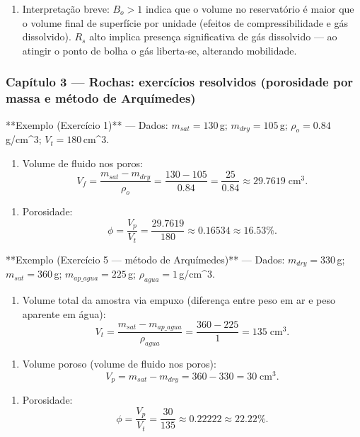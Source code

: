 \documentclass[11pt,a4paper]{article}
\begin{document}
\begin{enumerate}[label=\Alph*)]
\item Interpretação breve: $B_o>1$ indica que o volume no reservatório é maior que o volume final de superfície por unidade (efeitos de compressibilidade e gás dissolvido). $R_s$ alto implica presença significativa de gás dissolvido — ao atingir o ponto de bolha o gás liberta‑se, alterando mobilidade.\n\end{enumerate}

\subsubsection{Capítulo 3 — Rochas: exercícios resolvidos (porosidade por massa e método de Arquímedes)}

**Exemplo (Exercício 1)** — Dados: $m_{sat}=130\,$g; $m_{dry}=105\,$g; $\rho_o=0.84\,$g/cm^3; $V_t=180\,$cm^3.

\begin{enumerate}
\item Volume de fluido nos poros:
$$V_f=\dfrac{m_{sat}-m_{dry}}{\rho_o}=\dfrac{130-105}{0.84}=\dfrac{25}{0.84}\approx29.7619\;\text{cm}^3.$$ 
\end{enumerate}

\begin{enumerate}
\item Porosidade:
$$\phi=\dfrac{V_p}{V_t}=\dfrac{29.7619}{180}\approx0.16534\approx16.53\%.$$ 
\end{enumerate}

**Exemplo (Exercício 5 — método de Arquímedes)** — Dados: $m_{dry}=330\,$g; $m_{sat}=360\,$g; $m_{ap\_agua}=225\,$g; $\rho_{agua}=1\,$g/cm^3.

\begin{enumerate}
\item Volume total da amostra via empuxo (diferença entre peso em ar e peso aparente em água):
$$V_t=\dfrac{m_{sat}-m_{ap\_agua}}{\rho_{agua}}=\dfrac{360-225}{1}=135\;\text{cm}^3.$$ 
\end{enumerate}

\begin{enumerate}
\item Volume poroso (volume de fluido nos poros):
$$V_p=m_{sat}-m_{dry}=360-330=30\;\text{cm}^3.$$ 
\end{enumerate}

\begin{enumerate}
\item Porosidade:
$$\phi=\dfrac{V_p}{V_t}=\dfrac{30}{135}\approx0.22222\approx22.22\%. $$
\end{enumerate}
\end{document}
